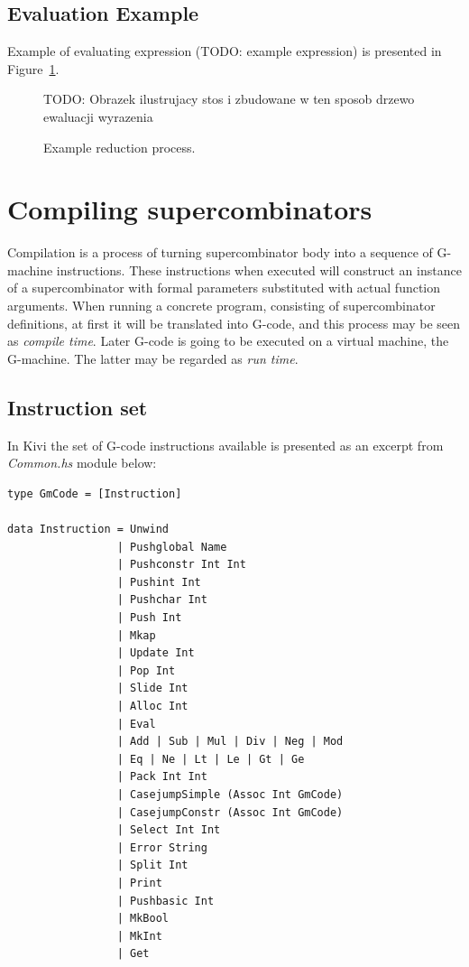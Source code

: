 \documentclass[12pt,a4paper]{report}
\begin{document}
\subsection{Evaluation Example}
Example of evaluating expression (TODO: example expression) is presented
in Figure~\ref{fig:example_reduction}.

\begin{figure}[h!]
  \centering

  TODO: Obrazek ilustrujacy stos i zbudowane w ten sposob drzewo ewaluacji
  wyrazenia

  \caption{Example reduction process.}
  \label{fig:example_reduction}
\end{figure}

\section{Compiling supercombinators}
Compilation is a process of turning supercombinator body into a sequence of
G-machine instructions. These instructions when executed will construct an
instance of a supercombinator with formal parameters substituted with actual
function arguments. When running a concrete program, consisting of
supercombinator definitions, at first it will be translated into G-code, and this
process may be seen as \textit{compile time}. Later G-code is going to be
executed on a virtual machine, the G-machine. The latter may be regarded as
\textit{run time}.


\subsection{Instruction set}
In Kivi the set of G-code instructions available is presented as an excerpt
from \textit{Common.hs} module below:

\vspace*{0.2in}
\begin{lstlisting}[style=haskell]
type GmCode = [Instruction]

data Instruction = Unwind
                 | Pushglobal Name
                 | Pushconstr Int Int
                 | Pushint Int
                 | Pushchar Int
                 | Push Int
                 | Mkap
                 | Update Int
                 | Pop Int
                 | Slide Int
                 | Alloc Int
                 | Eval
                 | Add | Sub | Mul | Div | Neg | Mod
                 | Eq | Ne | Lt | Le | Gt | Ge
                 | Pack Int Int
                 | CasejumpSimple (Assoc Int GmCode)
                 | CasejumpConstr (Assoc Int GmCode)
                 | Select Int Int
                 | Error String
                 | Split Int
                 | Print
                 | Pushbasic Int
                 | MkBool
                 | MkInt
                 | Get
\end{lstlisting}
\end{document}
